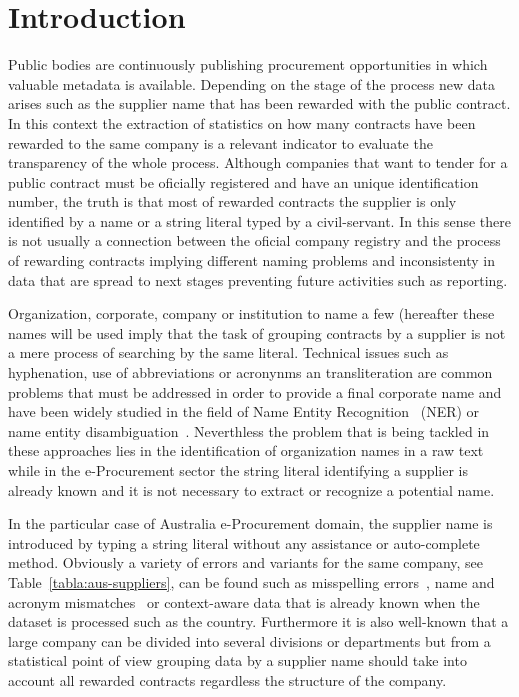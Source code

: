 \documentclass{llncs}
\begin{document}
\section{Introduction}
Public bodies are continuously publishing procurement opportunities in which 
valuable metadata is available. Depending on the stage of the process new data arises such 
as the supplier name that has been rewarded with the public contract. In this 
context the extraction of statistics on how many contracts have been 
rewarded to the same company is a relevant indicator to evaluate the transparency 
of the whole process. Although companies that want to tender for a public contract must be 
oficially registered and have an unique identification number, the truth is 
that most of rewarded contracts the supplier is only identified by a name or a string literal typed 
by a civil-servant. In this sense there is not usually a connection between 
the oficial company registry and the process of rewarding contracts implying different 
naming problems and inconsistenty in data that are spread to next stages preventing future 
activities such as reporting.

Organization, corporate, company or institution to name a few (hereafter these names will be used imply 
that the task of grouping contracts by a supplier is not a mere process of searching by the same literal. 
Technical issues such as hyphenation, use of abbreviations or acronynms an transliteration are 
common problems that must be addressed in order to provide a final corporate name and have been widely studied in the 
field of Name Entity Recognition~\cite{citeulike:1657521} (NER) or name entity disambiguation~\cite{Sarmento:2009:AWN:1602022.1602085,Klein:2003:NER:1119176.1119204}. 
Neverthless the problem that is being tackled in these approaches lies in the identification of organization 
names in a raw text while in the e-Procurement sector the string literal identifying a supplier is already 
known and it is not necessary to extract or recognize a potential name.


In the particular case of Australia e-Procurement domain, the supplier name is introduced by typing a string literal without any assistance or 
auto-complete method. Obviously a variety of errors and variants for the same company, see Table~\ref{tabla:aus-suppliers}, 
can be found such as misspelling errors~\cite{NorvigSpelling,StanfordSpelling}, name and acronym mismatches~\cite{Yeates99automaticextraction,Ratinov:2004:AES:1025132.1026366} 
or context-aware data that is already known when the dataset is processed such as the country. Furthermore it is also well-known that a large company can 
be divided into several divisions or departments but from a statistical point of view grouping data by a supplier name 
should take into account all rewarded contracts regardless the structure of the company.
\end{document}
